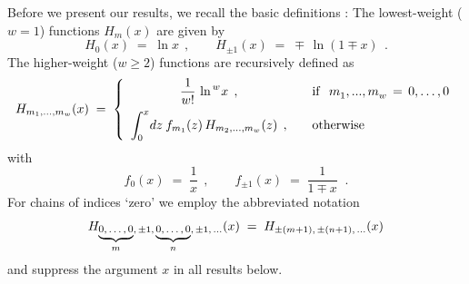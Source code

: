 \documentclass[12pt]{article}
\newcommand{\beq}{\begin{equation}}
\newcommand{\eeq}{\end{equation}}
\begin{document}
Before we present our results, we recall the basic definitions \cite{Hpols}:
The lowest-weight ($w = 1$) functions $H_m(x)$ are given by
%
\beq
\label{HPL1}
  H_0(x)       \; = \; \ln x \:\: , \quad\quad
  H_{\pm 1}(x) \; = \; \mp \, \ln (1 \mp x) \:\: .
\eeq
%
The higher-weight ($w \geq 2$) functions are recursively defined as
%
\beq
\label{HPL2}
  H_{m_1,...,m_w}(x) \; = \;
    \left\{ \begin{array}{cl}
    \displaystyle{ \frac{1}{w!}\,\ln^{\,w\!} x \:\: ,}
       & \quad {\rm if} \:\:\: m^{}_1,...,m^{}_w \,=\, 0,\ldots ,0 
\\[2ex]
    \displaystyle{ \int_0^x \! dz\: f_{m_1}(z) \, H_{m_2,...,m_w}(z)
       \:\: , } & \quad {\rm otherwise}
    \end{array} \right.
\eeq
%
with
\beq
\label{HPLf}
  f_0(x)       \; = \; \frac{1}{x} \:\: , \quad\quad
  f_{\pm 1}(x) \; = \; \frac{1}{1 \mp x} \;\; .
\eeq
%
For chains of indices `zero' we employ the abbreviated notation
%
\beq
\label{HPP-abbr}
  H_{{\footnotesize \underbrace{0,\ldots ,0}_{\scriptstyle m} },\,
  \pm 1,\, {\footnotesize \underbrace{0,\ldots ,0}_{\scriptstyle n} },
  \, \pm 1,\, \ldots}(x) \; = \; H_{\pm (m+1),\,\pm (n+1),\, \ldots}(x)
\eeq
%
and suppress the argument $x$ in all results below. 
\end{document}
